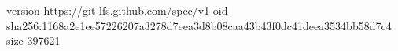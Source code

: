 version https://git-lfs.github.com/spec/v1
oid sha256:1168a2e1ee57226207a3278d7eea3d8b08caa43b43f0dc41deea3534bb58d7c4
size 397621
